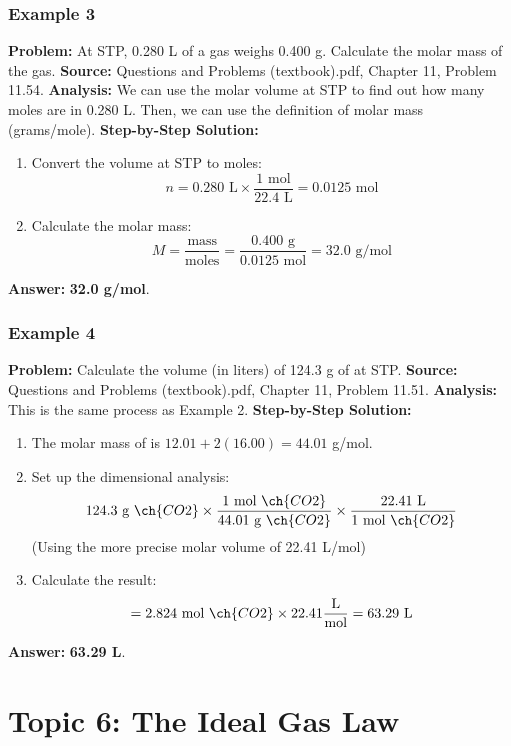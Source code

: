 \documentclass{article}
\begin{document}
\subsubsection{Example 3}
\textbf{Problem:} At STP, 0.280 L of a gas weighs 0.400 g. Calculate the molar mass of the gas.
\textbf{Source:} Questions and Problems (textbook).pdf, Chapter 11, Problem 11.54.
\textbf{Analysis:} We can use the molar volume at STP to find out how many moles are in 0.280 L. Then, we can use the definition of molar mass (grams/mole).
\textbf{Step-by-Step Solution:}
\begin{enumerate}
    \item Convert the volume at STP to moles:
    \[ n = 0.280 \text{ L} \times \frac{1 \text{ mol}}{22.4 \text{ L}} = 0.0125 \text{ mol} \]
    \item Calculate the molar mass:
    \[ M = \frac{\text{mass}}{\text{moles}} = \frac{0.400 \text{ g}}{0.0125 \text{ mol}} = 32.0 \text{ g/mol} \]
\end{enumerate}
\textbf{Answer:} \textbf{32.0 g/mol}.

\subsubsection{Example 4}
\textbf{Problem:} Calculate the volume (in liters) of 124.3 g of  at STP.
\textbf{Source:} Questions and Problems (textbook).pdf, Chapter 11, Problem 11.51.
\textbf{Analysis:} This is the same process as Example 2.
\textbf{Step-by-Step Solution:}
\begin{enumerate}
    \item The molar mass of  is $12.01 + 2(16.00) = 44.01$ g/mol.
    \item Set up the dimensional analysis:
    \[ 124.3 \text{ g } \ch{CO2} \times \frac{1 \text{ mol } \ch{CO2}}{44.01 \text{ g } \ch{CO2}} \times \frac{22.41 \text{ L}}{1 \text{ mol } \ch{CO2}} \]
    (Using the more precise molar volume of 22.41 L/mol)
    \item Calculate the result:
    \[ = 2.824 \text{ mol } \ch{CO2} \times 22.41 \frac{\text{L}}{\text{mol}} = 63.29 \text{ L} \]
\end{enumerate}
\textbf{Answer:} \textbf{63.29 L}.

\section{Topic 6: The Ideal Gas Law}
\end{document}
